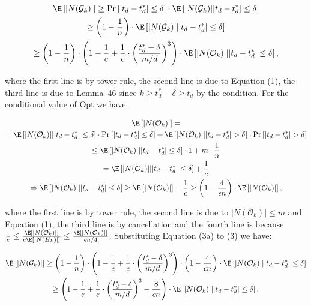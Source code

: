 \documentclass[10pt,a4paper]{article}
\begin{document}
\[\begin{gathered}
\displaystyle\E\left[|N(\mathcal{G}_{k})|\right] \displaystyle\geq\Pr\left[|t_{d}-t^{*}_{d}|\leq\delta\right]\cdot\E\left[|N(\mathcal{G}_{k})\middle||t_{d}-t^{*}_{d}|\leq\delta\right] \\
\displaystyle\geq\left(1-\frac{1}{n}\right)\cdot\E\left[|N(\mathcal{G}_{k})|\middle||t_{d}-t^{*}_{d}|\leq\delta\right] \\
\displaystyle\geq\left(1-\frac{1}{n}\right)\cdot\left(1-\frac{1}{e}+\frac{1}{e}\cdot\left(\frac{t^{*}_{d}-\delta}{m/d}\right)^{3}\right)\cdot\E\left[|N(\mathcal{O}_{k})|\middle||t_{d}-t^{*}_{d}|\leq\delta\right],
\end{gathered}\]


where the first line is by tower rule, the second line is due to Equation (1), the third line is due to Lemma 46 since $k\geq t^{*}_{d}-\delta\geq t_{d}$ by the condition.
For the conditional value of Opt we have:\par


\[\begin{gathered}
\displaystyle\E \displaystyle\left[|N(\mathcal{O}_{k})|\right]= \\
\displaystyle=\E\left[|N(\mathcal{O}_{k})|\middle||t_{d}-t^{*}_{d}|\leq\delta\right]\cdot\Pr\left[|t_{d}-t^{*}_{d}|\leq\delta\right]+\E\left[|N(\mathcal{O}_{k})|\middle||t_{d}-t^{*}_{d}|>\delta\right]\cdot\Pr\left[|t_{d}-t^{*}_{d}|>\delta\right] \\
\displaystyle\leq\E\left[|N(\mathcal{O}_{k})|\middle||t_{d}-t^{*}_{d}|\leq\delta\right]\cdot 1+m\cdot\frac{1}{n} \\
\displaystyle=\E\left[|N(\mathcal{O}_{k})|\middle||t_{d}-t^{*}_{d}|\leq\delta\right]+\frac{1}{c} \\
\displaystyle\Rightarrow\E\left[|N(\mathcal{O}_{k})|\middle||t_{d}-t^{*}_{d}|\leq\delta\right]\geq\E\left[|N(\mathcal{O}_{k})|\right]-\frac{1}{c}\geq\left(1-\frac{4}{\epsilon n}\right)\cdot\E\left[|N(\mathcal{O}_{k})|\right],
\end{gathered}\]


where the first line is by tower rule, the second line is due to $|N(\mathcal{O}_{k})|\leq m$ and Equation (1), the third line is by cancellation and the fourth line is because $\frac{1}{c}\leq\frac{\E\left[|N(\mathcal{O}_{k})|\right]}{c\E\left[|N(H_{k})|\right]}\leq\frac{\E\left[|N(\mathcal{O}_{k})|\right]}{\epsilon n/4}$.
Substituting Equation (3a) to (3) we have:\par


\[\begin{gathered}
\displaystyle\E\left[|N(\mathcal{G}_{k})|\right] \displaystyle\geq\left(1-\frac{1}{n}\right)\cdot\left(1-\frac{1}{e}+\frac{1}{e}\cdot\left(\frac{t^{*}_{d}-\delta}{m/d}\right)^{3}\right)\cdot\left(1-\frac{4}{\epsilon n}\right)\cdot\E\left[|N(\mathcal{O}_{k})|\middle||t_{d}-t^{*}_{d}|\leq\delta\right] \\
\displaystyle\geq\left(1-\frac{1}{e}+\frac{1}{e}\cdot\left(\frac{t^{*}_{d}-\delta}{m/d}\right)^{3}-\frac{8}{\epsilon n}\right)\cdot\E\left[|N(\mathcal{O}_{k})|\middle||t_{d}-t^{*}_{d}|\leq\delta\right].
\end{gathered}\]
\end{document}
